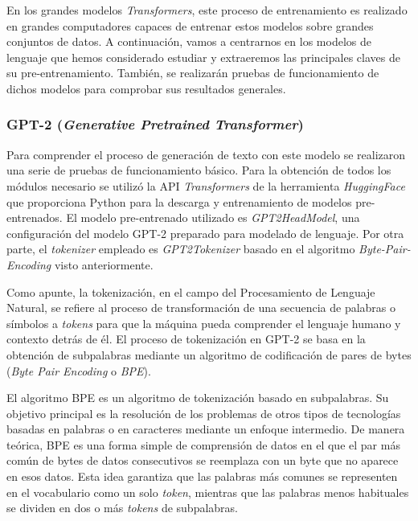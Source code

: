 En los grandes modelos \textit{Transformers}, este proceso de entrenamiento es realizado en grandes computadores capaces de entrenar estos modelos sobre grandes conjuntos de datos. A continuación, vamos a centrarnos en los modelos de lenguaje que hemos considerado estudiar y extraeremos las principales claves de su pre-entrenamiento. También, se realizarán pruebas de funcionamiento de dichos modelos para comprobar sus resultados generales.



\subsubsection{GPT-2 (\textit{Generative Pretrained Transformer})}

Para comprender el proceso de generación de texto con este modelo se realizaron una serie de pruebas de funcionamiento básico. Para la obtención de todos los módulos necesario se utilizó la API \textit{Transformers} de la herramienta \textit{HuggingFace} que proporciona Python para la descarga y entrenamiento de modelos pre-entrenados. El modelo pre-entrenado utilizado es \textit{GPT2HeadModel}, una configuración del modelo GPT-2 preparado para modelado de lenguaje. Por otra parte, el \textit{tokenizer} empleado es \textit{GPT2Tokenizer} basado en el algoritmo \textit{Byte-Pair-Encoding} visto anteriormente.

Como apunte, la tokenización, en el campo del Procesamiento de Lenguaje Natural, se refiere al proceso de transformación de una secuencia de palabras o símbolos a \textit{tokens} para que la máquina pueda comprender el lenguaje humano y contexto detrás de él. El proceso de tokenización en GPT-2 se basa en la obtención de subpalabras mediante un algoritmo de codificación de pares de bytes (\textit{Byte Pair Encoding} o \textit{BPE}).

El algoritmo BPE \citep{gage1994new} es un algoritmo de tokenización basado en subpalabras. Su objetivo principal es la resolución de los problemas de otros tipos de tecnologías basadas en palabras o en caracteres mediante un enfoque intermedio. De manera teórica, BPE es una forma simple de comprensión de datos en el que el par más común de bytes de datos consecutivos se reemplaza con un byte que no aparece en esos datos. Esta idea garantiza que las palabras más comunes se representen en el vocabulario como un solo \textit{token}, mientras que las palabras menos habituales se dividen en dos o más \textit{tokens} de subpalabras.

